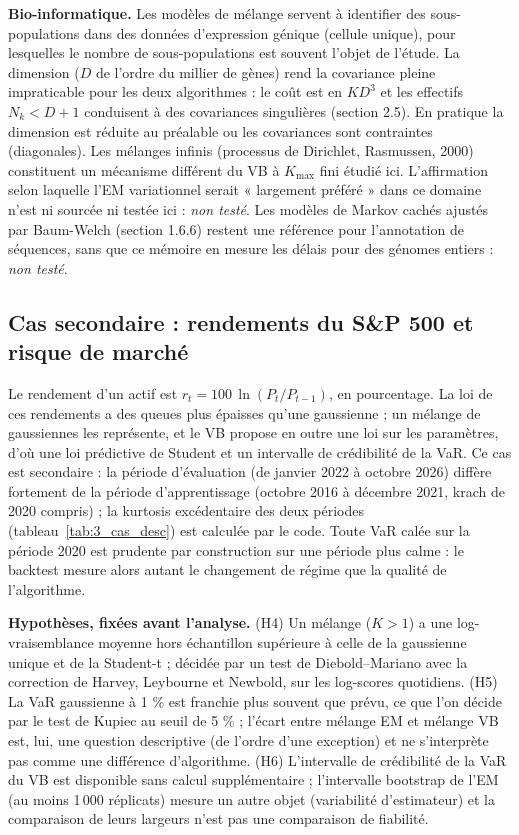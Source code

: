 \textbf{Bio-informatique. }Les modèles de mélange servent à identifier des sous-populations dans des données d'expression génique (cellule unique), pour lesquelles le nombre de sous-populations est souvent l'objet de l'étude. La dimension ($D$ de l'ordre du millier de gènes) rend la covariance pleine impraticable pour les deux algorithmes : le coût est en $KD^3$ et les effectifs $N_k < D+1$ conduisent à des covariances singulières (section 2.5). En pratique la dimension est réduite au préalable ou les covariances sont contraintes (diagonales). Les mélanges infinis (processus de Dirichlet, Rasmussen, 2000) constituent un mécanisme différent du VB à $K_{\max}$ fini étudié ici. L'affirmation selon laquelle l'EM variationnel serait « largement préféré » dans ce domaine n'est ni sourcée ni testée ici : \emph{non testé}. Les modèles de Markov cachés ajustés par Baum-Welch (section 1.6.6) restent une référence pour l'annotation de séquences, sans que ce mémoire en mesure les délais pour des génomes entiers : \emph{non testé}.


\subsection{Cas secondaire : rendements du S\&P 500 et risque de marché}
Le rendement d'un actif est $r_t = 100\,\ln(P_t/P_{t-1})$, en pourcentage. La loi de ces rendements a des queues plus épaisses qu'une gaussienne ; un mélange de gaussiennes les représente, et le VB propose en outre une loi sur les paramètres, d'où une loi prédictive de Student et un intervalle de crédibilité de la VaR. Ce cas est secondaire : la période d'évaluation (de janvier 2022 à octobre 2026) diffère fortement de la période d'apprentissage (octobre 2016 à décembre 2021, krach de 2020 compris) ; la kurtosis excédentaire des deux périodes (tableau~\ref{tab:3_cas_desc}) est calculée par le code. Toute VaR calée sur la période 2020 est prudente par construction sur une période plus calme : le backtest mesure alors autant le changement de régime que la qualité de l'algorithme.

\textbf{Hypothèses, fixées avant l'analyse. }(H4) Un mélange ($K>1$) a une log-vraisemblance moyenne hors échantillon supérieure à celle de la gaussienne unique et de la Student-t ; décidée par un test de Diebold--Mariano avec la correction de Harvey, Leybourne et Newbold, sur les log-scores quotidiens. (H5) La VaR gaussienne à 1 \% est franchie plus souvent que prévu, ce que l'on décide par le test de Kupiec au seuil de 5 \% ; l'écart entre mélange EM et mélange VB est, lui, une question descriptive (de l'ordre d'une exception) et ne s'interprète pas comme une différence d'algorithme. (H6) L'intervalle de crédibilité de la VaR du VB est disponible sans calcul supplémentaire ; l'intervalle bootstrap de l'EM (au moins 1\,000 réplicats) mesure un autre objet (variabilité d'estimateur) et la comparaison de leurs largeurs n'est pas une comparaison de fiabilité.

